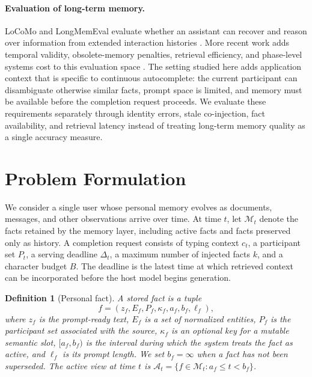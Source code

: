 \documentclass[letterpaper]{article} %
\newtheorem{definition}{Definition}
\begin{document}
\paragraph{Evaluation of long-term memory.} LoCoMo and LongMemEval evaluate whether an assistant can recover and reason over information from extended interaction histories \citep{maharana2024evaluating,wu2024longmemeval}. More recent work adds temporal validity, obsolete-memory penalties, retrieval efficiency, and phase-level systems cost to this evaluation space \citep{uddin2026memora,su2026tsm,huang2026licomemory,omri2026agentmemory}. The setting studied here adds application context that is specific to continuous autocomplete: the current participant can disambiguate otherwise similar facts, prompt space is limited, and memory must be available before the completion request proceeds. We evaluate these requirements separately through identity errors, stale co-injection, fact availability, and retrieval latency instead of treating long-term memory quality as a single accuracy measure.

\section{Problem Formulation}

We consider a single user whose personal memory evolves as documents, messages, and other observations arrive over time. At time $t$, let $\mathcal{M}_t$ denote the facts retained by the memory layer, including active facts and facts preserved only as history. A completion request consists of typing context $c_t$, a participant set $P_t$, a serving deadline $\Delta_t$, a maximum number of injected facts $k$, and a character budget $B$. The deadline is the latest time at which retrieved context can be incorporated before the host model begins generation.

\begin{definition}[Personal fact]
A stored fact is a tuple
\begin{equation}
f=(z_f,E_f,P_f,\kappa_f,a_f,b_f,\ell_f),
\end{equation}
where $z_f$ is the prompt-ready text, $E_f$ is a set of normalized entities, $P_f$ is the participant set associated with the source, $\kappa_f$ is an optional key for a mutable semantic slot, $[a_f,b_f)$ is the interval during which the system treats the fact as active, and $\ell_f$ is its prompt length. We set $b_f=\infty$ when a fact has not been superseded. The active view at time $t$ is $\mathcal{A}_t=\{f\in\mathcal{M}_t:a_f\le t<b_f\}$.
\end{definition}
\end{document}
